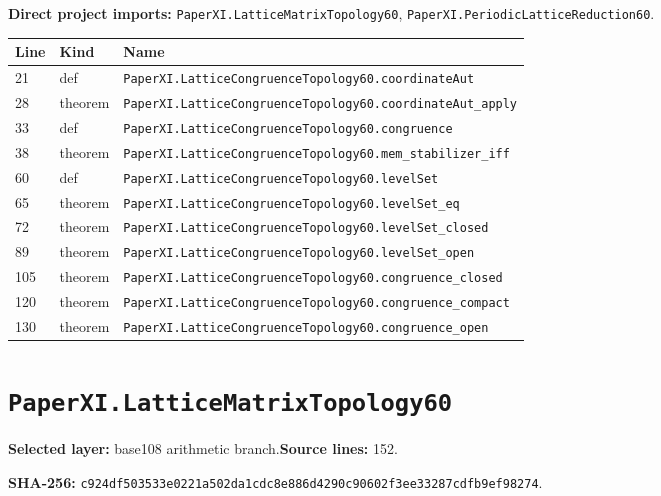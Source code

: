 \documentclass[10pt,oneside]{book}
\begin{document}
\textbf{Direct project imports:} \nolinkurl{PaperXI.LatticeMatrixTopology60}, \nolinkurl{PaperXI.PeriodicLatticeReduction60}.

\begin{longtable}{@{}p{}p{}p{}@{}}\toprule Line&Kind&Name\\\midrule\endhead

21&def&\nolinkurl{PaperXI.LatticeCongruenceTopology60.coordinateAut}\\

28&theorem&\nolinkurl{PaperXI.LatticeCongruenceTopology60.coordinateAut_apply}\\

33&def&\nolinkurl{PaperXI.LatticeCongruenceTopology60.congruence}\\

38&theorem&\nolinkurl{PaperXI.LatticeCongruenceTopology60.mem_stabilizer_iff}\\

60&def&\nolinkurl{PaperXI.LatticeCongruenceTopology60.levelSet}\\

65&theorem&\nolinkurl{PaperXI.LatticeCongruenceTopology60.levelSet_eq}\\

72&theorem&\nolinkurl{PaperXI.LatticeCongruenceTopology60.levelSet_closed}\\

89&theorem&\nolinkurl{PaperXI.LatticeCongruenceTopology60.levelSet_open}\\

105&theorem&\nolinkurl{PaperXI.LatticeCongruenceTopology60.congruence_closed}\\

120&theorem&\nolinkurl{PaperXI.LatticeCongruenceTopology60.congruence_compact}\\

130&theorem&\nolinkurl{PaperXI.LatticeCongruenceTopology60.congruence_open}\\

\bottomrule\end{longtable}

\section{\texorpdfstring{\nolinkurl{PaperXI.LatticeMatrixTopology60}}{PaperXI.LatticeMatrixTopology60}}\label{module:PaperXI.LatticeMatrixTopology60}

\textbf{Selected layer:} base108 arithmetic branch.\quad\textbf{Source lines:} 152.\par\textbf{SHA-256:} {\scriptsize\nolinkurl{c924df503533e0221a502da1cdc8e886d4290c90602f3ee33287cdfb9ef98274}}.
\end{document}
